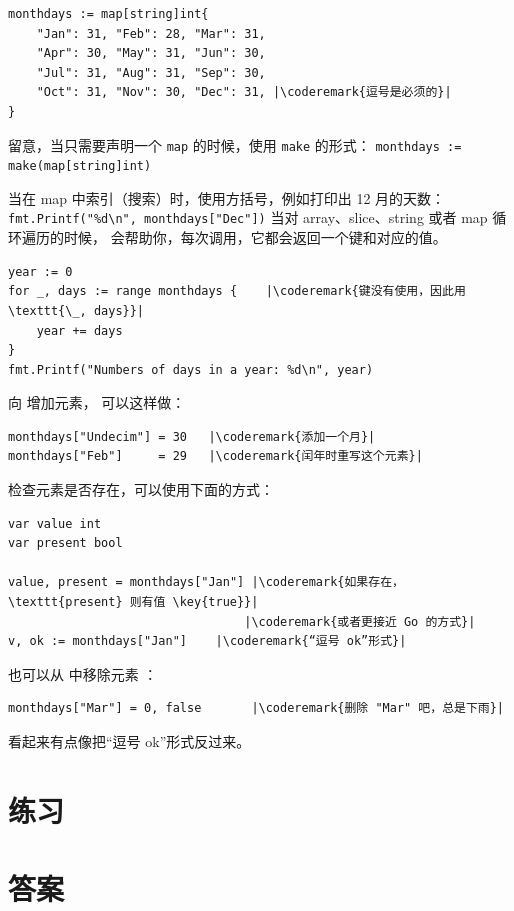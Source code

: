 \begin{lstlisting}
monthdays := map[string]int{
	"Jan": 31, "Feb": 28, "Mar": 31, 
	"Apr": 30, "May": 31, "Jun": 30, 
	"Jul": 31, "Aug": 31, "Sep": 30, 
	"Oct": 31, "Nov": 30, "Dec": 31, |\coderemark{逗号是必须的}|
}		    
\end{lstlisting}
留意，当只需要声明一个 \lstinline{map} 的时候，使用 \lstinline{make} 的形式：
\lstinline|monthdays := make(map[string]int)|

当在 map 中索引（搜索）时，使用方括号，例如打印出 12 月的天数：
\lstinline{fmt.Printf("%d\n", monthdays["Dec"])}\newline
当对 array、slice、string 或者 map 循环遍历的时候，
会帮助你，每次调用，它都会返回一个键和对应的值。
\begin{lstlisting}
year := 0
for _, days := range monthdays {    |\coderemark{键没有使用，因此用 \texttt{\_, days}}|
    year += days
}
fmt.Printf("Numbers of days in a year: %d\n", year)
\end{lstlisting}
向  增加元素， 可以这样做：
\begin{lstlisting}
monthdays["Undecim"] = 30	|\coderemark{添加一个月}|
monthdays["Feb"]     = 29	|\coderemark{闰年时重写这个元素}|
\end{lstlisting}
检查元素是否存在，可以使用下面的方式\cite{go_course_day2}：
\begin{lstlisting}
var value int
var present bool

value, present = monthdays["Jan"] |\coderemark{如果存在，\texttt{present} 则有值 \key{true}}|
                                 |\coderemark{或者更接近 Go 的方式}|
v, ok := monthdays["Jan"]	 |\coderemark{“逗号 ok”形式}|
\end{lstlisting}
也可以从  中移除元素 ：
\begin{lstlisting}
monthdays["Mar"] = 0, false       |\coderemark{删除 "Mar" 吧，总是下雨}|
\end{lstlisting}
看起来有点像把“逗号 ok”形式反过来。

\section{练习}








\cleardoublepage
\section{答案}
\shipoutAnswer
